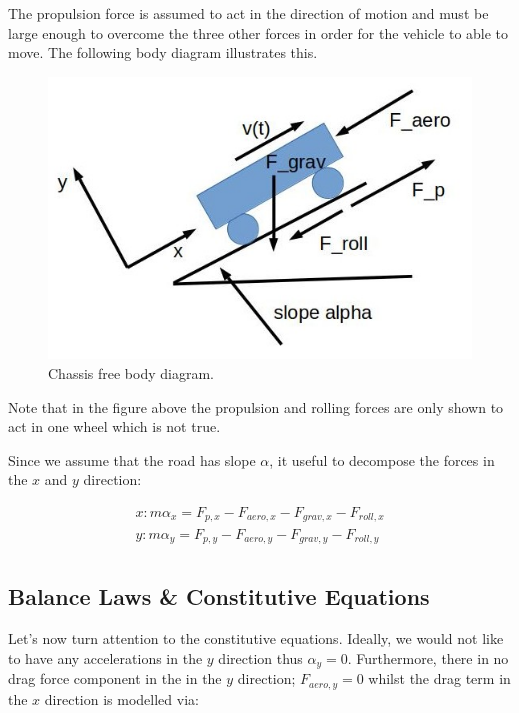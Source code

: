The propulsion force is assumed to act in the direction of motion and must be large enough to overcome the three other forces in order for
the vehicle to able to move. The following body diagram illustrates this.


\begin{figure}[!htb]
\begin{center}
\includegraphics[scale=0.280]{img/model_automotive_sys/free_diagram_chassis.jpg}
\end{center}
\caption{Chassis free body diagram.}
\label{free_diagram_chassis}
\end{figure}

Note that in the figure above the propulsion and rolling forces are only shown to act in one wheel which is not true.

Since we assume that the road has slope $\alpha$,  it useful to decompose the forces in the $x$ and $y$ direction:


\begin{eqnarray}
x: m\alpha_x = F_{p, x} - F_{aero,x} - F_{grav, x} - F_{roll, x}  \\
y: m\alpha_y = F_{p, y} - F_{aero,y} - F_{grav, y} - F_{roll, y}  \\
\label{chassis_model_force_decomp}
\end{eqnarray}


\subsection{Balance Laws \& Constitutive Equations}

Let's now turn attention to the constitutive equations. Ideally, we would not like to have any accelerations in the $y$ direction thus $\alpha_y =0$. Furthermore, there in no drag force component
in the in the $y$ direction; $F_{aero,y} = 0$ whilst the drag term in the $x$ direction is modelled via:

